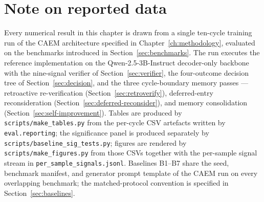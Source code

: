 %
%

\section*{Note on reported data}
\label{sec:data-note}

Every numerical result in this chapter is drawn from a single ten-cycle training run of the CAEM architecture specified in Chapter~\ref{ch:methodology}, evaluated on the benchmarks introduced in Section~\ref{sec:benchmarks}. The run executes the reference implementation on the Qwen-2.5-3B-Instruct decoder-only backbone with the nine-signal verifier of Section~\ref{sec:verifier}, the four-outcome decision tree of Section~\ref{sec:decision}, and the three cycle-boundary memory passes --- retroactive re-verification (Section~\ref{sec:retroverify}), deferred-entry reconsideration (Section~\ref{sec:deferred-reconsider}), and memory consolidation (Section~\ref{sec:self-improvement}). Tables are produced by \texttt{scripts/make\_tables.py} from the per-cycle CSV artefacts written by \texttt{eval.reporting}; the significance panel is produced separately by \texttt{scripts/baseline\_sig\_tests.py}; figures are rendered by \texttt{scripts/make\_figures.py} from those CSVs together with the per-sample signal stream in \texttt{per\_sample\_signals.jsonl}. Baselines B1--B7 share the seed, benchmark manifest, and generator prompt template of the CAEM run on every overlapping benchmark; the matched-protocol convention is specified in Section~\ref{sec:baselines}.

